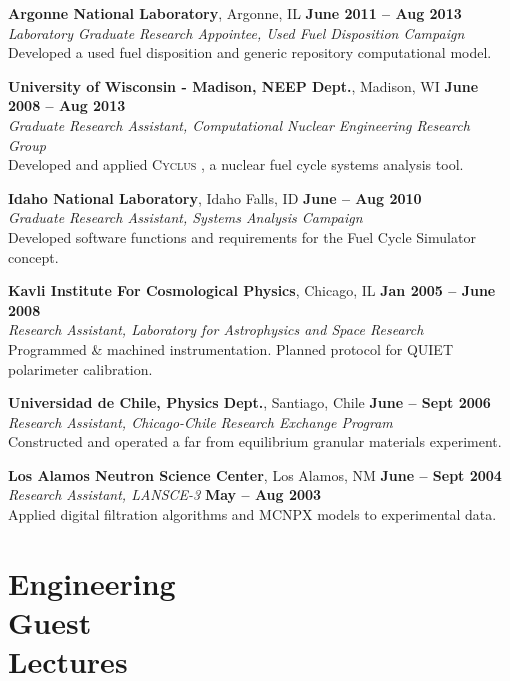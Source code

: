 \documentclass[margin,line]{resume}
\newcommand{\Cyclus}{\textsc{Cyclus }}
\begin{document}
\begin{resume}
    \textbf{Argonne National Laboratory}, Argonne, IL \hfill \textbf{June 2011 -- Aug 2013}\\
		\textsl{Laboratory Graduate Research Appointee, Used Fuel Disposition Campaign}\\ 
		Developed a used fuel disposition and generic repository computational model.

    \textbf{University of Wisconsin - Madison, NEEP Dept.}, Madison, WI \hfill \textbf{June 2008 -- Aug 2013}\\
		\textsl{Graduate Research Assistant, Computational Nuclear Engineering Research Group}\\ 
		Developed and applied \Cyclus, a nuclear fuel cycle systems analysis tool.

    \textbf{Idaho National Laboratory}, Idaho Falls, ID \hfill \textbf{June -- Aug 2010}\\
		\textsl{Graduate Research Assistant, Systems Analysis Campaign}\\ 
		Developed software functions and requirements for the Fuel Cycle Simulator concept.

    \textbf{Kavli Institute For Cosmological Physics}, Chicago, IL \hfill \textbf{Jan 2005 -- June 2008}\\
                \textsl{Research Assistant, Laboratory for Astrophysics and Space Research}\\
                Programmed \& machined instrumentation. Planned protocol for QUIET polarimeter calibration.

    \textbf{Universidad de Chile, Physics Dept.}, Santiago, Chile \hfill \textbf{June -- Sept 2006}\\
                \textsl{Research Assistant, Chicago-Chile Research Exchange Program}\\
                 Constructed and operated a far from equilibrium granular materials experiment.

    \textbf{Los Alamos Neutron Science Center}, Los Alamos, NM \hfill \textbf{June -- Sept 2004}\\ 
                \textsl{Research Assistant, LANSCE-3} \hfill \textbf{May -- Aug 2003}\\
                Applied digital filtration algorithms and MCNPX models to experimental data.
    \pagebreak
    \section{\mysidestyle Engineering\\Guest\\Lectures}


\end{resume}
\end{document}
